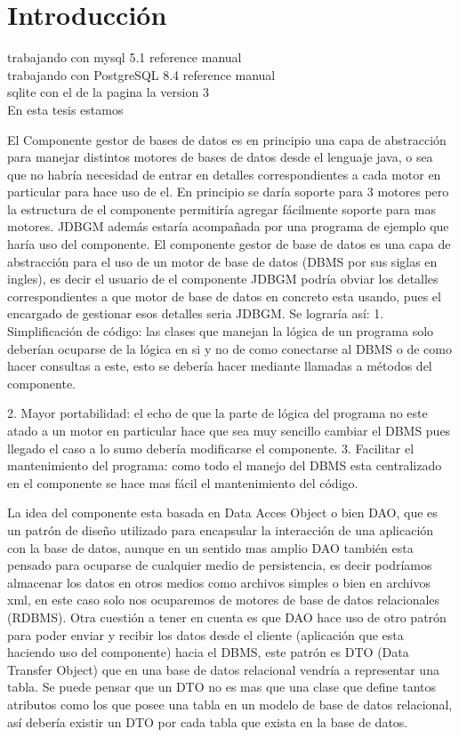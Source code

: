 \chapter{Introducción}
trabajando con mysql 5.1 reference manual\\

trabajando con PostgreSQL 8.4 reference manual\\

sqlite con el de la pagina la version 3\\
En esta tesis estamos


El Componente gestor de bases de datos es en principio una capa de abstracción para manejar distintos motores de bases de datos desde el lenguaje java, o sea que no habría necesidad de entrar en detalles correspondientes a cada motor en particular para hace uso de el. En principio se daría soporte para 3 motores pero  la estructura de el componente permitiría agregar fácilmente soporte para mas motores. JDBGM además estaría acompañada por una programa de ejemplo que haría uso del componente.
 El componente gestor de base  de datos es una capa de abstracción para el uso de un motor de base de datos (DBMS por sus siglas en ingles), es decir el usuario de el componente JDBGM podría obviar los detalles correspondientes a que motor de base de datos en concreto esta usando, pues el encargado de gestionar esos detalles seria JDBGM. Se lograría así:
1. Simplificación de código: las clases que manejan la lógica de un programa solo deberían ocuparse de la lógica en si y no de como conectarse al DBMS o de como hacer consultas a este, esto se debería hacer mediante llamadas a métodos del componente.

2. Mayor portabilidad: el echo de que la parte de lógica del programa no este atado a un motor en particular hace que sea muy sencillo cambiar el DBMS pues llegado el caso a lo sumo debería modificarse el componente.
3. Facilitar el mantenimiento del programa: como todo el manejo del DBMS esta centralizado en el componente se hace mas fácil el mantenimiento del código.

La idea del componente esta basada en Data Acces Object o bien DAO, que es un patrón de diseño utilizado para encapsular la interacción de una aplicación con la base de datos, aunque en un sentido mas amplio DAO también esta pensado para ocuparse de cualquier medio de persistencia, es decir podríamos almacenar los datos en otros medios como archivos simples o bien en archivos xml, en este caso solo nos ocuparemos de motores de base de datos relacionales (RDBMS). Otra cuestión a tener en cuenta es que DAO hace uso de otro patrón para poder enviar y recibir los datos desde el cliente (aplicación que esta haciendo uso del componente) hacia el DBMS, este patrón es DTO  (Data Transfer Object) que en una base de datos relacional vendría a representar una tabla. Se puede pensar que un DTO no es mas que una clase que define tantos atributos como los que posee una tabla en un  modelo de base de datos relacional, así debería existir un DTO por cada tabla que exista en la    base de datos. 

